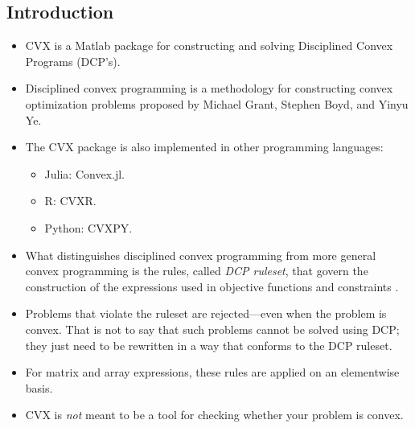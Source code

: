 \documentclass{article}
\begin{document}
\subsection{Introduction}
\begin{itemize}
    \item CVX is a Matlab package for constructing and solving Disciplined Convex Programs (DCP's).
    \item Disciplined convex programming is a methodology for constructing convex optimization problems proposed by Michael Grant, Stephen Boyd, and Yinyu Ye.
    \item The CVX package is also implemented in other programming languages:
    \begin{itemize}
        \item Julia: Convex.jl.
        \item R: CVXR.
        \item Python: CVXPY.
    \end{itemize}
    \item What distinguishes disciplined convex programming from more general convex programming is the rules, called \emph{DCP ruleset}, that govern the construction of the expressions used in objective functions and constraints \autocite{DCPRulesetCVX}.
    \item Problems that violate the ruleset are rejected—even when the problem is convex. That is not to say that such problems cannot be solved using DCP; they just need to be rewritten in a way that conforms to the DCP ruleset.
    \item For matrix and array expressions, these rules are applied on an elementwise basis.
    \item CVX is \emph{not} meant to be a tool for checking whether your problem is convex.
\end{itemize}
\end{document}
